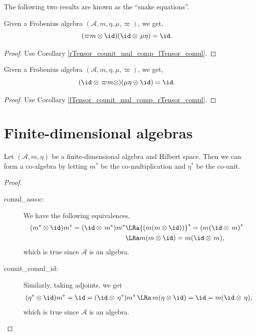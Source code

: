  The following two results are known as the ``snake equations''.
 \begin{corollary}\label{rTensor_counit_mul_comp_lTensor_comul_unit}
  \leanok
  Given a Frobenius algebra $(\mathcal{A},m,\eta,\mu,\varpi)$, we get,
  \[(\varpi m\otimes\id)(\id\otimes\,\mu\eta)=\id.\]
 \end{corollary}
 \begin{proof}\leanok
  Use Corollary \ref{rTensor_counit_mul_comp_lTensor_comul}.
 \end{proof}
 \begin{corollary}\label{lTensor_counit_mul_comp_rTensor_comul_unit}
  \leanok
  Given a Frobenius algebra $(\mathcal{A},m,\eta,\mu,\varpi)$, we get,
  \[(\id\otimes\,\varpi m\otimes)(\mu\eta\otimes\id)=\id.\]
 \end{corollary}
 \begin{proof}\leanok
  Use Corollary \ref{lTensor_counit_mul_comp_rTensor_comul}.
 \end{proof}

\section{Finite-dimensional algebras}
 
 \begin{proposition}\label{Coalgebra.ofFiniteDimensionalHilbertAlgebra}
  \leanok
  Let $(\mathcal{A},m,\eta)$ be a finite-dimensional algebra and Hilbert space. Then we can form a co-algebra by letting $m^*$ be the co-multiplication and $\eta^*$ be the co-unit.
 \end{proposition}
 \begin{proof}\leanok {\ }
  \begin{description}
   \item[comul\_assoc:]
    We have the following equivalences,
    \begin{align*}
      (m^*\otimes\id)m^*=(\id\otimes\,m^*)m^* &\LRa {(m(m\otimes\id))}^*={(m(\id\otimes\,m)}^*\\
      &\LRa m(m\otimes\id)=m(\id\otimes\,m),
    \end{align*}
    which is true since $\mathcal{A}$ is an algebra.
   \item[counit\_comul\_id:]
    Similarly, taking adjoints, we get
    \begin{align*}
     &\, (\eta^*\otimes\id)m^*=\id=(\id\otimes\,\eta^*)m^*
     \,\LRa\, m(\eta\otimes\id)=\id=m(\id\otimes\,\eta),
    \end{align*}
    which is true since $\mathcal{A}$ is an algebra.
  \end{description}
 \end{proof}
 

